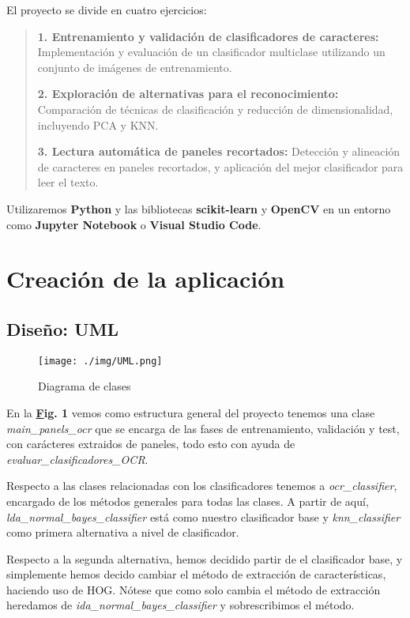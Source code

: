 \documentclass[a4paper, 12pt]{article}
\begin{document}
El proyecto se divide en cuatro ejercicios:

\begin{quote}
	\textbf{1. Entrenamiento y validación de clasificadores de caracteres:} Implementación y evaluación de un clasificador multiclase utilizando un conjunto de imágenes de entrenamiento.
	
	\textbf{2. Exploración de alternativas para el reconocimiento:} Comparación de técnicas de clasificación y reducción de dimensionalidad, incluyendo PCA y KNN.

	\textbf{3. Lectura automática de paneles recortados:} Detección y alineación de caracteres en paneles recortados, y aplicación del mejor clasificador para leer el texto.
	
\end{quote}


Utilizaremos \textbf{Python} y las bibliotecas \textbf{scikit-learn} y \textbf{OpenCV} en un entorno como \textbf{Jupyter Notebook} o \textbf{Visual Studio Code}.

\section{Creación de la aplicación}
\subsection{Diseño: UML}
\begin{figure}
	\centering
	\texttt{[image: ./img/UML.png]}
	\caption{Diagrama de clases}
	\label{fig:uml}
\end{figure}

En la \textbf{\hyperref[fig:uml] Fig. 1} vemos como estructura general del proyecto tenemos una clase \textit{main\_panels\_ocr} que se encarga de las fases de entrenamiento, validación y test, con carácteres extraidos de paneles, todo esto con ayuda de \textit{evaluar\_clasificadores\_OCR}.

Respecto a las clases relacionadas con los clasificadores tenemos a \textit{ocr\_classifier}, encargado de los métodos generales para todas las clases. A partir de aquí, \textit{lda\_normal\_bayes\_classifier} está como nuestro clasificador base y \textit{knn\_classifier} como primera alternativa a nivel de clasificador. 

Respecto a la segunda alternativa, hemos decidido partir de el clasificador base, y simplemente hemos decido cambiar el método de extracción de características, haciendo uso de HOG. Nótese que como solo cambia el método de extracción heredamos de \textit{ida\_normal\_bayes\_classifier}  y sobrescribimos el método.
\end{document}
